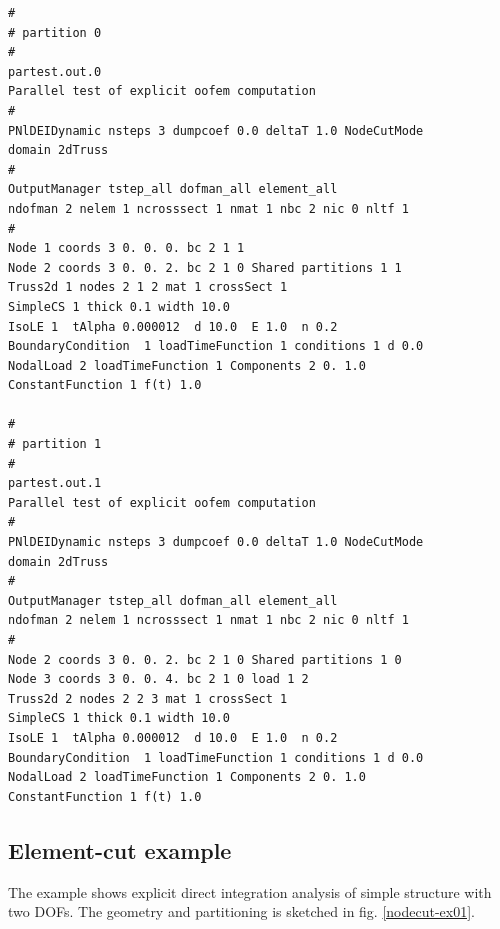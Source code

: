 \documentclass[a4paper]{article}
\begin{document}
\begin{verbatim}
#
# partition 0
#
partest.out.0
Parallel test of explicit oofem computation
#
PNlDEIDynamic nsteps 3 dumpcoef 0.0 deltaT 1.0 NodeCutMode
domain 2dTruss
#
OutputManager tstep_all dofman_all element_all
ndofman 2 nelem 1 ncrosssect 1 nmat 1 nbc 2 nic 0 nltf 1
#
Node 1 coords 3 0. 0. 0. bc 2 1 1
Node 2 coords 3 0. 0. 2. bc 2 1 0 Shared partitions 1 1
Truss2d 1 nodes 2 1 2 mat 1 crossSect 1
SimpleCS 1 thick 0.1 width 10.0
IsoLE 1  tAlpha 0.000012  d 10.0  E 1.0  n 0.2
BoundaryCondition  1 loadTimeFunction 1 conditions 1 d 0.0
NodalLoad 2 loadTimeFunction 1 Components 2 0. 1.0
ConstantFunction 1 f(t) 1.0

#
# partition 1
#
partest.out.1
Parallel test of explicit oofem computation
#
PNlDEIDynamic nsteps 3 dumpcoef 0.0 deltaT 1.0 NodeCutMode
domain 2dTruss
#
OutputManager tstep_all dofman_all element_all
ndofman 2 nelem 1 ncrosssect 1 nmat 1 nbc 2 nic 0 nltf 1
#
Node 2 coords 3 0. 0. 2. bc 2 1 0 Shared partitions 1 0
Node 3 coords 3 0. 0. 4. bc 2 1 0 load 1 2
Truss2d 2 nodes 2 2 3 mat 1 crossSect 1
SimpleCS 1 thick 0.1 width 10.0
IsoLE 1  tAlpha 0.000012  d 10.0  E 1.0  n 0.2
BoundaryCondition  1 loadTimeFunction 1 conditions 1 d 0.0
NodalLoad 2 loadTimeFunction 1 Components 2 0. 1.0
ConstantFunction 1 f(t) 1.0
\end{verbatim}

\subsection{Element-cut example}
The example shows explicit direct integration analysis of
simple structure with two DOFs. The geometry and partitioning is sketched in
fig. \ref{nodecut-ex01}.
\end{document}

